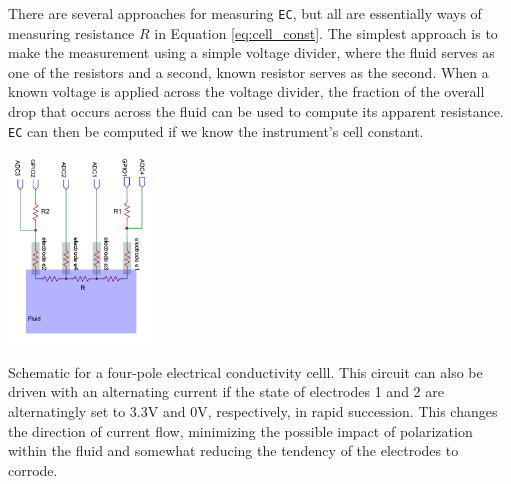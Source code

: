 There are several approaches for measuring \texttt{EC}, but all are essentially ways of measuring resistance $R$ in Equation \ref{eq:cell_const}. The simplest approach is to make the measurement using a simple voltage divider, where the fluid serves as one of the resistors and a second, known resistor serves as the second.  When a known voltage is applied across the voltage divider, the fraction of the overall drop that occurs across the fluid can be used to compute its apparent resistance.  \texttt{EC} can then be computed if we know the instrument's cell constant.

\begin{marginfigure}[0cm]
	\begin{center}
		\includegraphics[height=5cm]{Images/4pole_circuit.png}
		\caption[Four-pole EC cell]{Schematic for a four-pole electrical conductivity celll. This circuit can also be driven with an alternating current if the state of electrodes 1 and 2 are alternatingly set to 3.3V and 0V, respectively, in rapid succession. This changes the direction of current flow, minimizing the possible impact of polarization within the fluid and somewhat reducing the tendency of the electrodes to corrode.}
	\end{center}
\end{marginfigure}

